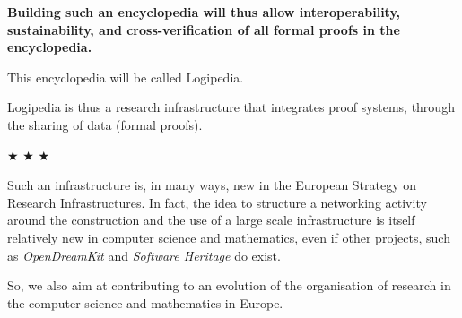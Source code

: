 \medskip

{\bf Building such an encyclopedia will thus allow interoperability,
  sustainability, and cross-verification of all formal proofs in the
  encyclopedia.}

This encyclopedia will be called Logipedia.

Logipedia is thus a research infrastructure that integrates proof
systems, through the sharing of data (formal proofs).

\begin{center}
$\bigstar$ $\bigstar$ $\bigstar$
\end{center}

Such an infrastructure is, in many ways, new in the European Strategy
on Research Infrastructures. In fact, the idea to structure a
networking activity around the construction and the use of a large
scale infrastructure is itself relatively new in computer science and
mathematics, even if other projects, such as {\em OpenDreamKit} and
{\em Software Heritage} do exist.

So, we also aim at contributing to an evolution of the organisation of
research in the computer science and mathematics in Europe.

